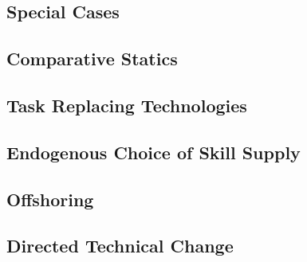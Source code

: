 \documentclass[12pt]{article}
\theoremstyle{definition}
\begin{document}
\subsection{Special Cases}

\subsection{Comparative Statics}

\subsection{Task Replacing Technologies}

\subsection{Endogenous Choice of Skill Supply}

\subsection{Offshoring}

\subsection{Directed Technical Change}





\end{document}
